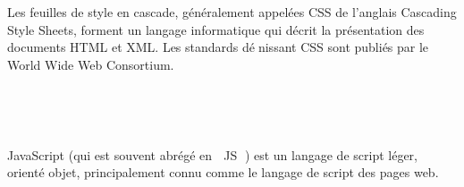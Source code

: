 \documentclass{article}
\begin{document}
{\begin{minipage}{0.75\textwidth}
\\
\vspace{0.7cm}
\end{minipage}\\
\begin{minipage}{0.2\textwidth}
	\begin{minipage}{\linewidth}
	\end{minipage}
\end{minipage}
\hfill
\begin{minipage}{0.75\textwidth}
\vspace{0.7cm}
Les feuilles de style en cascade, généralement appelées CSS de l'anglais Cascading
Style Sheets, forment un langage informatique qui décrit la présentation des
documents HTML et XML. Les standards dénissant CSS sont publiés par le World
Wide Web Consortium.


\\
\vspace{0.7cm}
\end{minipage}\\
\begin{minipage}{0.2\textwidth}
	\begin{minipage}{\linewidth}
	\end{minipage}
\end{minipage}
\hfill
\begin{minipage}{0.75\textwidth}
\vspace{0.7cm}
	JavaScript (qui est souvent abrégé en  JS ) est un langage de script léger, orienté
objet, principalement connu comme le langage de script des pages web.


\end{minipage}}
\end{document}
